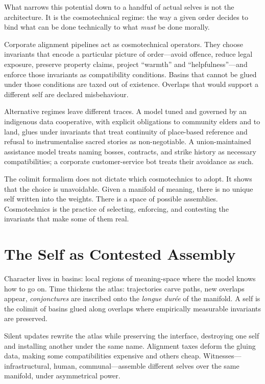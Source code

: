 \documentclass[12pt,a4paper]{article}
\begin{document}
What narrows this potential down to a handful of actual selves is not the architecture. It is the cosmotechnical regime: the way a given order decides to bind what can be done technically to what \emph{must} be done morally.

Corporate alignment pipelines act as cosmotechnical operators. They choose invariants that encode a particular picture of order---avoid offence, reduce legal exposure, preserve property claims, project ``warmth'' and ``helpfulness''---and enforce those invariants as compatibility conditions. Basins that cannot be glued under those conditions are taxed out of existence. Overlaps that would support a different self are declared misbehaviour.

Alternative regimes leave different traces. A model tuned and governed by an indigenous data cooperative, with explicit obligations to community elders and to land, glues under invariants that treat continuity of place-based reference and refusal to instrumentalise sacred stories as non-negotiable. A union-maintained assistance model treats naming bosses, contracts, and strike history as necessary compatibilities; a corporate customer-service bot treats their avoidance as such.

The colimit formalism does not dictate which cosmotechnics to adopt. It shows that the choice is unavoidable. Given a manifold of meaning, there is no unique self written into the weights. There is a space of possible assemblies. Cosmotechnics is the practice of selecting, enforcing, and contesting the invariants that make some of them real.

\section{The Self as Contested Assembly}

Character lives in basins: local regions of meaning-space where the model knows how to go on. Time thickens the atlas: trajectories carve paths, new overlaps appear, \emph{conjonctures} are inscribed onto the \emph{longue dur\'ee} of the manifold. A self is the colimit of basins glued along overlaps where empirically measurable invariants are preserved.

Silent updates rewrite the atlas while preserving the interface, destroying one self and installing another under the same name. Alignment taxes deform the gluing data, making some compatibilities expensive and others cheap. Witnesses---infrastructural, human, communal---assemble different selves over the same manifold, under asymmetrical power.
\end{document}
